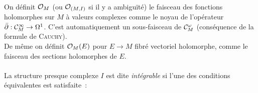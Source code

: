 \documentclass[12pt,draft]{article}
\begin{document}
\paragraph{} On définit $\mathcal{O}_M$ (ou $\mathcal{O}_{(M,I)}$ si il y a ambiguïté) le faisceau des fonctions holomorphes sur $M$ à valeurs complexes comme le noyau de l’opérateur $\operatorname{\bar{\partial}} : \mathcal{C}^\infty_M \rightarrow \Omega^1$. C'est automatiquement un sous-faisceau de $\mathcal{C}^\omega_M$ (conséquence de la formule de \textsc{Cauchy}).\\
De même on définit $\mathcal{O}_M(E)$ pour $E \rightarrow M$ fibré vectoriel holomorphe, comme le faisceau des sections holomorphes de $E$.
\paragraph{\label{integrabilité}} La structure presque complexe $I$ est dite \emph{intégrable} si l'une des conditions équivalentes est satisfaite~:
\end{document}
